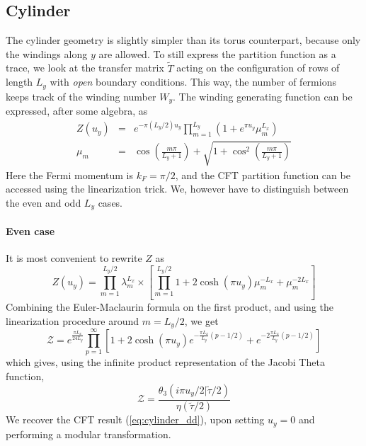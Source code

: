 \documentclass[11pt]{iopart}
\begin{document}
\subsection{Cylinder}
The cylinder geometry is slightly simpler than its torus counterpart, because only the windings along $y$ are allowed. To still express the partition function as a trace, we look at the transfer matrix $\tilde{T}$ acting on the configuration of rows of length $L_y$ with \emph{open} boundary conditions. This way, the number of fermions keeps track of the winding number $W_y$. The winding generating function can be expressed, after some algebra, as
\begin{eqnarray}
 Z(u_y)&=&e^{-\pi (L_y/2)u_y}\prod_{m=1}^{L_y} \left(1+e^{\pi u_y}\mu_m^{L_x}\right)\\
 \mu_m&=&\cos \left(\frac{m \pi}{L_y+1}\right)+\sqrt{1+\cos^2\left(\frac{m \pi}{L_y+1}\right)}
\end{eqnarray}
Here the Fermi momentum is $k_F=\pi/2$, and the CFT partition function can be accessed using the linearization trick. We, however have to distinguish between the even and odd $L_y$ cases.
\paragraph{Even case}
It is most convenient to rewrite $Z$ as
\begin{equation}
Z(u_y)=\prod_{m=1}^{L_y/2} \lambda_m^{L_x}\times \left[\prod_{m=1}^{L_y/2} 1+2\cosh (\pi u_y)\mu_m^{-L_x}+\mu_m^{-2L_x}\right] 
\end{equation}
Combining the Euler-Maclaurin formula on the first product, and using the linearization procedure around $m=L_y/2$, we get
\begin{equation}
 \mathcal{Z}= e^{\frac{\pi L_x}{24 L_y}}\prod_{p=1}^{\infty}\left[1+2 \cosh (\pi u_y)e^{-\frac{\pi L_x}{L_y}(p-1/2)}+e^{-2\frac{\pi L_x}{L_y}(p-1/2)}\right]
\end{equation}
which gives, using the infinite product representation of the Jacobi Theta function,
\begin{equation}
 \mathcal{Z}=\frac{\theta_3(i \pi u_y/2|\tilde{\tau}/2)}{\eta(\tilde{\tau}/2)}
\end{equation}
We recover the CFT result (\ref{eq:cylinder_dd}), upon setting $u_y=0$ and performing a modular transformation. 
\end{document}
